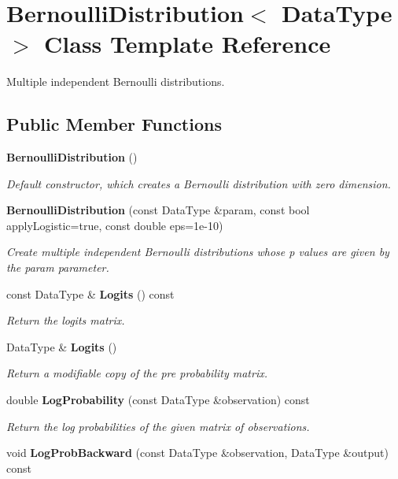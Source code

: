 \section{Bernoulli\+Distribution$<$ Data\+Type $>$ Class Template Reference}
\label{classmlpack_1_1ann_1_1BernoulliDistribution}


Multiple independent Bernoulli distributions.  


\subsection*{Public Member Functions}
\begin{DoxyCompactItemize}
\item 
\textbf{ Bernoulli\+Distribution} ()
\begin{DoxyCompactList}\small\item\em Default constructor, which creates a Bernoulli distribution with zero dimension. \end{DoxyCompactList}\item 
\textbf{ Bernoulli\+Distribution} (const Data\+Type \&param, const bool apply\+Logistic=true, const double eps=1e-\/10)
\begin{DoxyCompactList}\small\item\em Create multiple independent Bernoulli distributions whose p values are given by the param parameter. \end{DoxyCompactList}\item 
const Data\+Type \& \textbf{ Logits} () const
\begin{DoxyCompactList}\small\item\em Return the logits matrix. \end{DoxyCompactList}\item 
Data\+Type \& \textbf{ Logits} ()
\begin{DoxyCompactList}\small\item\em Return a modifiable copy of the pre probability matrix. \end{DoxyCompactList}\item 
double \textbf{ Log\+Probability} (const Data\+Type \&observation) const
\begin{DoxyCompactList}\small\item\em Return the log probabilities of the given matrix of observations. \end{DoxyCompactList}\item 
void \textbf{ Log\+Prob\+Backward} (const Data\+Type \&observation, Data\+Type \&output) const

\end{DoxyCompactItemize}

